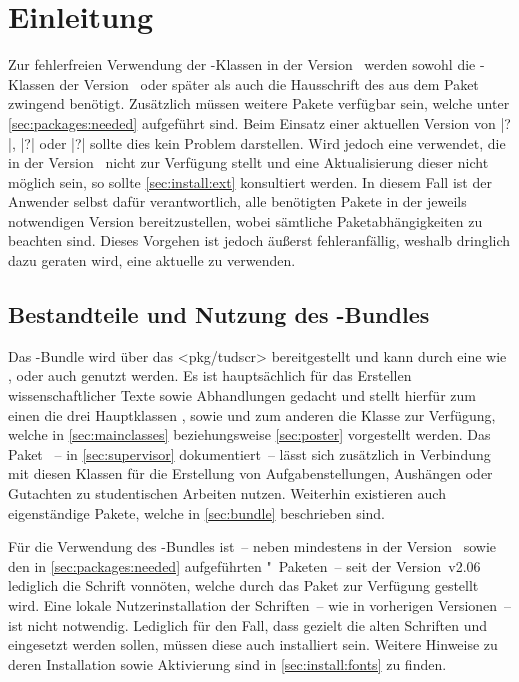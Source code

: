 \chapter{Einleitung}
%
Zur fehlerfreien Verwendung der \TUDScript-Klassen in der Version~\vTUDScript{} 
werden sowohl die \KOMAScript-Klassen der Version~\vKOMAScript{} oder später 
als auch die Hausschrift des \CDs \OpenSans aus dem Paket  
zwingend benötigt. Zusätzlich müssen weitere Pakete verfügbar sein, welche 
unter \autoref{sec:packages:needed} aufgeführt sind. Beim Einsatz einer 
aktuellen Version von \TeXLive|?|, \MacTeX|?| oder \MiKTeX|?| sollte dies kein 
Problem darstellen. Wird jedoch eine \DistributionGeneral verwendet, die 
\TUDScript in der Version~\vTUDScript{} nicht zur Verfügung stellt und eine 
Aktualisierung dieser nicht möglich sein, so sollte \autoref{sec:install:ext} 
konsultiert werden. In diesem Fall ist der Anwender selbst dafür 
verantwortlich, alle benötigten Pakete in der jeweils notwendigen Version 
bereitzustellen, wobei sämtliche Paketabhängigkeiten zu beachten sind. Dieses 
Vorgehen ist jedoch äußerst fehleranfällig, weshalb dringlich dazu geraten 
wird, eine aktuelle \DistributionGeneral zu verwenden.



\section{Bestandteile und Nutzung des \TUDScript-Bundles}
%
%
Das \TUDScript-Bundle wird über das \CTAN<pkg/tudscr> bereitgestellt und kann 
durch eine \DistributionGeneral wie \TeXLive, \MacTeX oder auch \MiKTeX genutzt 
werden. Es ist hauptsächlich für das Erstellen wissenschaftlicher Texte sowie 
Abhandlungen gedacht und stellt hierfür zum einen die drei Hauptklassen 
,  sowie  und zum 
anderen die Klasse  zur Verfügung, welche in 
\autoref{sec:mainclasses} beziehungsweise \autoref{sec:poster} vorgestellt 
werden. Das Paket ~-- in \autoref{sec:supervisor} 
dokumentiert~-- lässt sich zusätzlich in Verbindung mit diesen Klassen für die 
Erstellung von Aufgabenstellungen, Aushängen oder Gutachten zu studentischen 
Arbeiten nutzen. Weiterhin existieren auch eigenständige Pakete, welche in 
\autoref{sec:bundle} beschrieben sind. 

Für die Verwendung des \TUDScript-Bundles ist~-- neben \KOMAScript mindestens 
in der Version~\vKOMAScript{} sowie den in \autoref{sec:packages:needed} 
aufgeführten "~Paketen~-- seit der Version~v2.06 lediglich die 
Schrift \OpenSans vonnöten, welche durch das Paket  zur 
Verfügung gestellt wird. Eine lokale Nutzerinstallation der Schriften~-- wie in 
vorherigen Versionen~-- ist nicht notwendig. Lediglich für den Fall, dass 
gezielt die alten Schriften \Univers und \DIN eingesetzt werden sollen, müssen 
diese auch installiert sein. Weitere Hinweise zu deren Installation sowie 
Aktivierung sind in \autoref{sec:install:fonts} zu finden.


